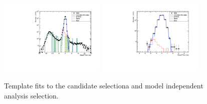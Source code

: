 \begin{figure}[h]
\centering
{\label{fig:can}\includegraphics[width=0.45\textwidth]{analysis_figs/cadidate.pdf}}
{\label{fig:fit}\includegraphics[width=0.45\textwidth]{analysis_figs/final_fit.pdf}}
\caption{Template fits to the candidate selectiona and model independent analysis selection.}
\label{fig:beamhalo}
\end{figure}
